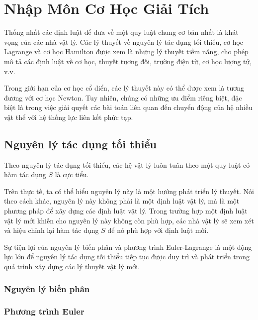   
\chapter{Nhập Môn Cơ Học Giải Tích}

Thống nhất các định luật để đưa về một quy luật chung cơ bản nhất là khát vọng của các nhà vật lý. Các lý thuyết về nguyên lý tác dụng tối thiểu, cơ học Lagrange và cơ học Hamilton được xem là những lý thuyết tiềm năng, cho phép mô tả các định luật về cơ học, thuyết tương đối, trường điện từ, cơ học lượng tử, v.v.

Trong giới hạn của cơ học cổ điển, các lý thuyết này có thể được xem là tương đương với cơ học Newton. Tuy nhiên, chúng có những ưu điểm riêng biệt, đặc biệt là trong việc giải quyết các bài toán liên quan đến chuyển động của hệ nhiều vật thể với hệ thống lực liên kết phức tạp.

\section{Nguyên lý tác dụng tối thiểu}

Theo nguyên lý tác dụng tối thiểu, các hệ vật lý luôn tuân theo một quy luật có hàm tác dụng \(S\) là cực tiểu.

Trên thực tế, ta có thể hiểu nguyên lý này là một hướng phát triển lý thuyết. Nói theo cách khác, nguyên lý này không phải là một định luật vật lý, mà là một phương pháp để xây dựng các định luật vật lý. Trong trường hợp một định luật vật lý mới khiến cho nguyên lý này không còn phù hợp, các nhà vật lý sẽ xem xét và hiệu chỉnh lại hàm tác dụng \(S\) để nó phù hợp với định luật mới.

Sự tiện lợi của nguyên lý biến phân và phương trình Euler-Lagrange là một động lực lớn để nguyên lý tác dụng tối thiểu tiếp tục được duy trì và phát triển trong quá trình xây dựng các lý thuyết vật lý mới.

\subsection{Nguyên lý biến phân}



\subsection{Phương trình Euler}

